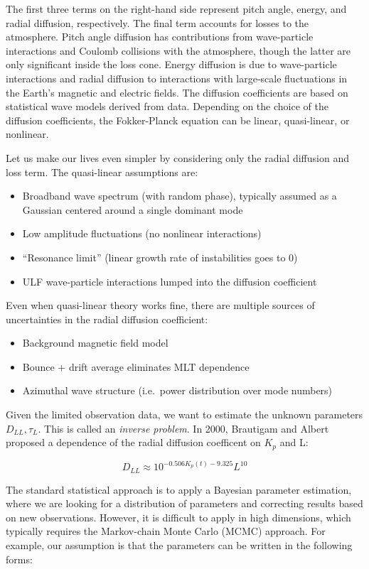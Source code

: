 \documentclass[
  notoc %
]{tufte-book}
\providecommand{\tightlist}{%
  \setlength{\itemsep}{0pt}\setlength{\parskip}{0pt}
}
\begin{document}
The first three terms on the right-hand side represent pitch angle,
energy, and radial diffusion, respectively. The final term accounts for
losses to the atmosphere. Pitch angle diffusion has contributions from
wave-particle interactions and Coulomb collisions with the atmosphere,
though the latter are only significant inside the loss cone. Energy
diffusion is due to wave-particle interactions and radial diffusion to
interactions with large-scale fluctuations in the Earth's magnetic and
electric fields. The diffusion coefficients are based on statistical
wave models derived from data. Depending on the choice of the diffusion
coefficients, the Fokker-Planck equation can be linear, quasi-linear, or
nonlinear.

Let us make our lives even simpler by considering only the radial
diffusion and loss term. The quasi-linear assumptions are:

\begin{itemize}
\tightlist
\item
  Broadband wave spectrum (with random phase), typically assumed as a
  Gaussian centered around a single dominant mode
\item
  Low amplitude fluctuations (no nonlinear interactions)
\item
  ``Resonance limit'' (linear growth rate of instabilities goes to 0)
\item
  ULF wave-particle interactions lumped into the diffusion coefficient
\end{itemize}

Even when quasi-linear theory works fine, there are multiple sources of
uncertainties in the radial diffusion coefficient:

\begin{itemize}
\tightlist
\item
  Background magnetic field model
\item
  Bounce + drift average eliminates MLT dependence
\item
  Azimuthal wave structure (i.e.~power distribution over mode numbers)
\end{itemize}

Given the limited observation data, we want to estimate the unknown
parameters \(D_{LL}, \tau_L\). This is called an \emph{inverse problem}.
In 2000, Brautigam and Albert proposed a dependence of the radial
diffusion coefficent on \(K_p\) and L:

\[
D_{LL} \approx 10^{-0.506 K_p(t) - 9.325}L^10
\]

The standard statistical approach is to apply a Bayesian parameter
estimation, where we are looking for a distribution of parameters and
correcting results based on new observations. However, it is difficult
to apply in high dimensions, which typically requires the Markov-chain
Monte Carlo (MCMC) approach. For example, our assumption is that the
parameters can be written in the following forms:
\end{document}
